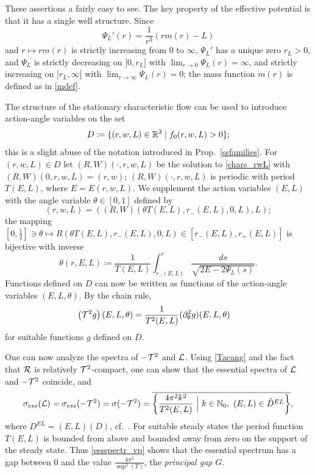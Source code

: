 \documentclass[11pt]{article}
\begin{document}
%
%
These assertions a fairly easy to see. The key property of the effective
potential is that it has a single well structure. Since
\[
\Psi_L'(r) = \frac{1}{r^3} \left(r m(r) - L\right)
\]
and $r\mapsto r m(r)$ is strictly increasing from $0$ to $\infty$,
$\Psi_L'$ has a unique zero $r_L>0$, and $\Psi_L$ is strictly
decreasing on $]0,r_L]$ with $\lim_{r\to 0}\Psi_L(r) = \infty$,
and strictly increasing on $[r_L,\infty[$ with $\lim_{r\to \infty}\Psi_L(r) = 0$;
the mass function $m(r)$ is defined as in \eqref{mdef}.

The structure of the stationary characteristic flow
can be used to introduce action-angle variables
on the set
\begin{align*}
  D \coloneqq \{(r,w,L)\in\mathbb R^3 \mid f_0(r,w,L) > 0\};
\end{align*}
this is a slight abuse of the notation introduced in Prop.~\ref{ssfamilies}.
For $(r,w,L)\in D$ let $(R,W)(\cdot,r,w,L)$
be the solution to \eqref{chars_rwL} with
$(R,W)(0,r,w,L)=(r,w)$; $(R,W)(\cdot,r,w,L)$
is periodic with period $T(E,L)$, where $E=E(r,w,L)$.
We supplement the action variables $(E,L)$ with the
angle variable $\theta\in[0,1]$ defined by
\[
(r,w,L) = \left( (R,W)(\theta T(E,L), r_-(E,L),0,L), L \right);
\]
the mapping
$[0,\frac{1}{2}]\ni\theta\mapsto R(\theta T(E,L),r_-(E,L),0,L)\in
[r_-(E,L),r_+(E,L)]$
is bijective with inverse
\[
\theta(r,E,L) \coloneqq
\frac{1}{T(E,L)} \int_{r_-(E,L)}^r \frac{ds}{\sqrt{2E-2\Psi_L(s)}}.
\]
Functions defined on $D$ can now be written as functions
of the action-angle variables $(E,L,\theta)$.
By the chain rule,
\begin{align}
  \left({\cal T}^2 g\right) (E,L,\theta)
  &=
  \frac{1}{T^2 (E,L)} (\partial_\theta^2 g) (E,L,\theta)\label{Tacang}
\end{align}
for suitable functions $g$ defined on $D$.

One can now analyze the spectra of  $-{\cal T}^2$ and ${\cal L}$.
Using \eqref{Tacang} and the fact that ${{\cal R}}$ is relatively ${\cal T}^2$-compact,
one can show that the essential spectra of ${\cal L}$ and $-{\cal T}^2$ coincide,
and
\begin{align}\label{essspectr_vp}
  \sigma_{ess}({\cal L})=\sigma_{ess}(-{\cal T}^2)=\sigma (-{\cal T}^2)
  = \overline{ \left\{  \frac{4\pi^2k^2}{T^2(E,L)}  ~\Big|~ k\in\mathbb N_0,\
  (E,L)\in\mathring D^{EL} \right\} },
\end{align}
where $D^{EL}=(E,L)(D)$, cf.~\cite[Theorems~5,7, 5.9]{HaStrRe2022}.
For suitable steady states the period function $T(E,L)$
is bounded from above and bounded away from zero on the support
of the steady state.
Thus \eqref{essspectr_vp} shows that the essential spectrum has
a gap between $0$ and the value $\frac{4\pi^2}{\sup^2(T)}$,
the {\em principal gap} $G$. 
\end{document}
